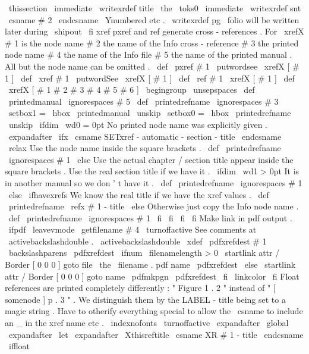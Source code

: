 {{{{{
\
thissection
}
%
\
immediate
\
writexrdef
{
title
}
{
\
the
\
toks0
}
%
\
immediate
\
writexrdef
{
snt
}
{
\
csname
#
2
\
endcsname
}
%
\
Ynumbered
etc
.
\
writexrdef
{
pg
}
{
\
folio
}
%
will
be
written
later
during
\
shipout
}
%
\
fi
}
%
xref
pxref
and
ref
generate
cross
-
references
.
For
\
xrefX
#
1
is
%
the
node
name
#
2
the
name
of
the
Info
cross
-
reference
#
3
the
printed
%
node
name
#
4
the
name
of
the
Info
file
#
5
the
name
of
the
printed
%
manual
.
All
but
the
node
name
can
be
omitted
.
%
\
def
\
pxref
#
1
{
\
putwordsee
{
}
\
xrefX
[
#
1
]
}
\
def
\
xref
#
1
{
\
putwordSee
{
}
\
xrefX
[
#
1
]
}
\
def
\
ref
#
1
{
\
xrefX
[
#
1
]
}
\
def
\
xrefX
[
#
1
#
2
#
3
#
4
#
5
#
6
]
{
\
begingroup
\
unsepspaces
\
def
\
printedmanual
{
\
ignorespaces
#
5
}
%
\
def
\
printedrefname
{
\
ignorespaces
#
3
}
%
\
setbox1
=
\
hbox
{
\
printedmanual
\
unskip
}
%
\
setbox0
=
\
hbox
{
\
printedrefname
\
unskip
}
%
\
ifdim
\
wd0
=
0pt
%
No
printed
node
name
was
explicitly
given
.
\
expandafter
\
ifx
\
csname
SETxref
-
automatic
-
section
-
title
\
endcsname
\
relax
%
Use
the
node
name
inside
the
square
brackets
.
\
def
\
printedrefname
{
\
ignorespaces
#
1
}
%
\
else
%
Use
the
actual
chapter
/
section
title
appear
inside
%
the
square
brackets
.
Use
the
real
section
title
if
we
have
it
.
\
ifdim
\
wd1
>
0pt
%
It
is
in
another
manual
so
we
don
'
t
have
it
.
\
def
\
printedrefname
{
\
ignorespaces
#
1
}
%
\
else
\
ifhavexrefs
%
We
know
the
real
title
if
we
have
the
xref
values
.
\
def
\
printedrefname
{
\
refx
{
#
1
-
title
}
{
}
}
%
\
else
%
Otherwise
just
copy
the
Info
node
name
.
\
def
\
printedrefname
{
\
ignorespaces
#
1
}
%
\
fi
%
\
fi
\
fi
\
fi
%
%
Make
link
in
pdf
output
.
\
ifpdf
\
leavevmode
\
getfilename
{
#
4
}
%
{
\
turnoffactive
%
See
comments
at
\
activebackslashdouble
.
{
\
activebackslashdouble
\
xdef
\
pdfxrefdest
{
#
1
}
%
\
backslashparens
\
pdfxrefdest
}
%
%
\
ifnum
\
filenamelength
>
0
\
startlink
attr
{
/
Border
[
0
0
0
]
}
%
goto
file
{
\
the
\
filename
.
pdf
}
name
{
\
pdfxrefdest
}
%
\
else
\
startlink
attr
{
/
Border
[
0
0
0
]
}
%
goto
name
{
\
pdfmkpgn
{
\
pdfxrefdest
}
}
%
\
fi
}
%
\
linkcolor
\
fi
%
%
Float
references
are
printed
completely
differently
:
"
Figure
1
.
2
"
%
instead
of
"
[
somenode
]
p
.
3
"
.
We
distinguish
them
by
the
%
LABEL
-
title
being
set
to
a
magic
string
.
{
%
%
Have
to
otherify
everything
special
to
allow
the
\
csname
to
%
include
an
_
in
the
xref
name
etc
.
\
indexnofonts
\
turnoffactive
\
expandafter
\
global
\
expandafter
\
let
\
expandafter
\
Xthisreftitle
\
csname
XR
#
1
-
title
\
endcsname
}
%
\
iffloat
\
}}}
